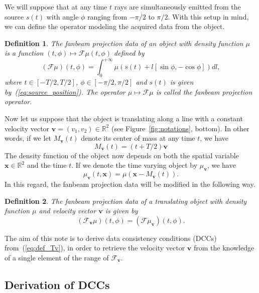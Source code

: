 \documentclass[twocolumn]{IEEEtran}
\newcommand{\R}{\mathbb{R}}
\newcommand{\bx}{\mathbf{x}}
\newcommand{\bv}{\mathbf{v}}
\newcommand{\Mbv}{M_{\mathbf{v}}}
\newcommand{\Tbv}{\mathcal{F}_{\mathbf{v}}}
\newcommand{\mubv}{\mu_{\mathbf{v}}}
\newtheorem{definition}{Definition}
\begin{document}
We will suppose that at any time $t$ rays are simultaneously emitted from the source $s(t)$ with angle $\phi$ ranging from $-\pi/2$ to $\pi/2$. With this setup in mind, we can define the operator modeling the acquired data from the object.
\begin{definition}
The \emph{fanbeam projection data} of an object with density function $\mu$ is a function $(t,\phi) \mapsto \mathcal{F}\mu(t,\phi)$ defined by
\begin{equation}
	(\mathcal{F}\mu)(t,\phi) = \int_0^{+\infty} \mu \left( s(t) + l \left[ \sin \phi, -\cos \phi \right] \right) dl,
\end{equation}
where $t \in \left[ -T/2, T/2\right]$, $\phi \in \left[ -\pi/2, \pi/2\right]$ and $s(t)$ is given by~(\ref{eq:source_position}). The operator $\mu \mapsto \mathcal{F}\mu$ is called the \emph{fanbeam projection operator}.
\end{definition}


Now let us suppose that the object is translating along a line with a constant velocity vector $\bv = (v_1, v_2)\in \R^2$ (see Figure~\ref{fig:notations}, bottom). In other words, if we let $\Mbv(t)$ denote its center of mass at any time $t$, we have
\begin{equation}
	\Mbv(t) =   \left( t + T/2 \right) \bv
\label{eq:center_of_mass}
\end{equation}
The density function of the object now depends on both the spatial variable $\bx \in \R^2$ and the time $t$. If we denote the time varying object by $\mubv$, we have
\begin{equation}
	\mubv(t,\bx) = \mu\left( \bx - \Mbv(t)\right).
\end{equation}
In this regard, the fanbeam projection data will be modified in the following way.
\begin{definition}
The \emph{fanbeam projection data of a translating object} with density function $\mu$ and  velocity vector $\bv$ is given by
\begin{equation}
	(\Tbv\mu)(t,\phi) =  ( \mathcal{F} \mubv ) (t,\phi).
\label{eq:def_Tv}
\end{equation}
\end{definition}

The aim of this note is to derive data consistency conditions (DCCs) from~(\ref{eq:def_Tv}), in order to retrieve the velocity vector $\bv$ from the knowledge of a single element of the range of $\Tbv$.

\subsection{Derivation of DCCs}
\end{document}
